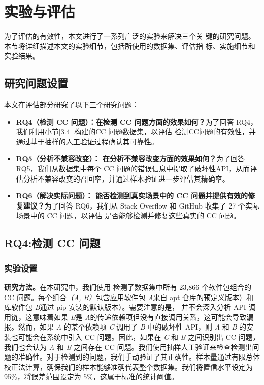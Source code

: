 \chapter{实验与评估}
为了评估\tool{}的有效性，本文进行了一系列广泛的实验来解决三个关
键的研究问题。本节将详细描述本文的实验细节，包括所使用的数据集、评估指
标、实施细节和实验结果。

\section{研究问题设置}
本文在评估部分研究了以下三个研究问题：
\begin{itemize}
	\item \textbf{RQ4（检测 CC 问题）：\tool{}在检测 CC 问题方面的效果如何？}为了回答 RQ4，我们利用小节\ref{3.4} 构建的CC 问题数据集，以评估\tool{} 检测CC问题的有效性，并通过基于抽样的人工验证过程确认其可靠性。
	\item \textbf{RQ5（分析不兼容改变）：\tool{} 在分析不兼容改变方面的效果如何？}为了回答 RQ5，我们从数据集中每个 CC 问题的错误信息中提取了破坏性API，从而评估分析不兼容改变的召回率，并通过样本验证进一步评估其精确率。
	\item \textbf{RQ6（解决实际问题）：\tool{} 能否检测到真实场景中的 CC 问题并提供有效的修复建议？}为了回答 RQ6，我们从 Stack Overflow 和 GitHub 收集了 27 个实际场景中的 CC 问题，以评估 \tool{} 是否能够检测并修复这些真实的 CC 问题。
\end{itemize}

\section{RQ4:检测 CC 问题}
\subsection{实验设置}
\textbf{研究方法。}在本研究中，我们使用 \tool{} 检测了数据集中所有 23,866 个软件包组合的 CC 问题。每个组合\textit{（A, B）}包含应用软件包 \textit{A}来自 apt 仓库的预定义版本）和库软件包 \textit{B}通过 pip 安装的默认版本）。需要注意的是， \tool{} 并不会深入分析 API 调用链，这意味着如果 \textit{B}是 \textit{A}的传递依赖项但没有直接调用关系，这可能会导致漏报。然而，如果 \textit{A} 的某个依赖项 \textit{C} 调用了 \textit{B} 中的破坏性 API，则 \textit{A} 和 \textit{B} 的安装也可能会在系统中引入 CC 问题。因此，如果在 \textit{C} 和 \textit{B} 之间识别出 CC 问题，我们也会认为 \textit{A} 和 \textit{B} 之间存在 CC 问题。我们使用抽样人工验证来检查检测出问题的准确性。对于检测到的问题，我们手动验证了其正确性。样本量通过有限总体校正法计算，确保我们的样本能够准确代表整个数据集。我们将置信水平设定为 95\%，将误差范围设定为 5\%，这属于标准的统计阈值。

